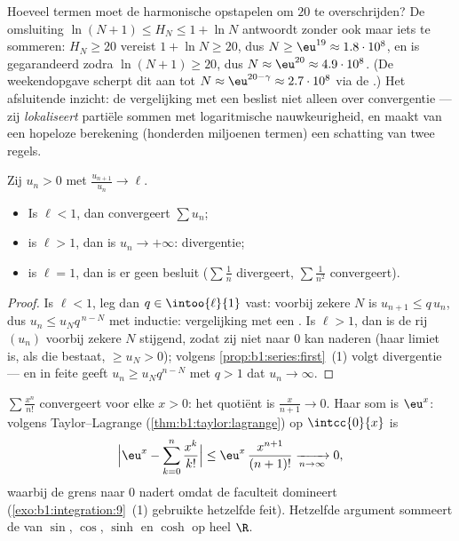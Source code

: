 \begin{example}\label{ex:b1:series:harmonicstack}
Hoeveel termen moet de harmonische  opstapelen om $20$ te
overschrijden? De omsluiting $\ln(N+1) \leq H_N \leq 1 + \ln N$
antwoordt zonder ook maar iets te sommeren: $H_N \geq 20$ vereist
$1 + \ln N \geq 20$, dus $N \geq \eu^{19} \approx 1.8\cdot10^{8}$,
en is gegarandeerd zodra $\ln(N + 1) \geq 20$, dus $N \approx
\eu^{20} \approx 4.9\cdot10^{8}$. (De weekendopgave scherpt dit
aan tot $N \approx \eu^{20 - \gamma} \approx 2.7\cdot10^{8}$ via
de .) Het afsluitende inzicht: de vergelijking
met een  beslist niet alleen over convergentie --- zij
\emph{lokaliseert} partiële sommen met logaritmische
nauwkeurigheid, en maakt van een hopeloze berekening (honderden
miljoenen termen) een schatting van twee regels.
\end{example}

\begin{theorem}\label{thm:b1:series:ratio}
Zij $u_n > 0$ met $\frac{u_{n+1}}{u_n} \to
\ell$.
\begin{itemize}
  \item Is $\ell < 1$, dan convergeert $\sum u_n$;
  \item is $\ell > 1$, dan is $u_n \to +\infty$: divergentie;
  \item is $\ell = 1$, dan is er geen besluit ($\sum \frac1n$
        divergeert, $\sum \frac{1}{n^2}$ convergeert).
\end{itemize}
\end{theorem}

\begin{proof}
Is $\ell < 1$, leg dan $q \in \intoo{\ell}{1}$ vast: voorbij zekere
$N$ is $u_{n+1} \leq q\,u_n$, dus $u_n \leq u_N q^{\,n-N}$ met
inductie: vergelijking met een . Is $\ell > 1$, dan
is de rij $(u_n)$ voorbij zekere $N$ stijgend, zodat zij niet naar
$0$ kan naderen (haar limiet is, als die bestaat, $\geq u_N > 0$);
volgens \cref{prop:b1:series:first}~(1) volgt divergentie --- en in
feite geeft $u_n \geq u_N q^{n-N}$ met $q > 1$ dat $u_n \to \infty$.
\end{proof}

\begin{example}\label{ex:b1:series:ratio}
$\sum \frac{x^n}{n!}$ convergeert voor elke $x > 0$: het quotiënt
is $\frac{x}{n+1} \to 0$. Haar som is $\eu^x$: volgens
Taylor--Lagrange (\cref{thm:b1:taylor:lagrange}) op $\intcc{0}{x}$
is
\[
\Bigl| \eu^x - \sum_{k=0}^{n} \frac{x^k}{k!} \Bigr|
\leq \eu^{x}\, \frac{x^{n+1}}{(n+1)!} \xrightarrow[n\to\infty]{} 0 ,
\]
waarbij de grens naar $0$ nadert omdat de faculteit domineert
(\cref{exo:b1:integration:9}~(1) gebruikte hetzelfde feit).
Hetzelfde argument sommeert de  van $\sin$, $\cos$, $\sinh$
en $\cosh$ op heel $\R$.
\end{example}

